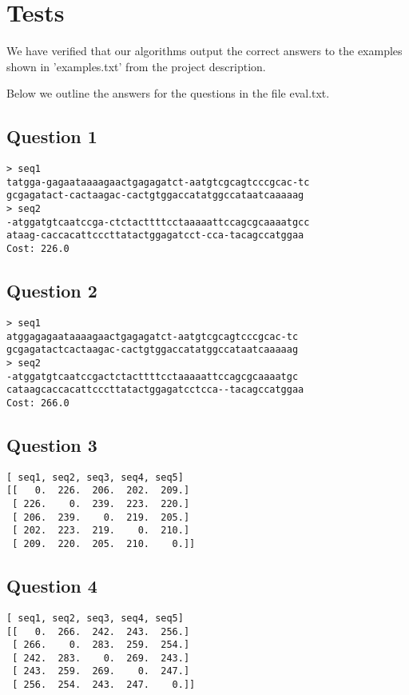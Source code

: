\section{Tests}
We have verified that our algorithms output the correct answers to the examples shown in 'examples.txt' from the project description. 

Below we outline the answers for the questions in the file eval.txt.

\subsection{Question 1}

\begin{verbatim}
> seq1
tatgga-gagaataaaagaactgagagatct-aatgtcgcagtcccgcac-tc
gcgagatact-cactaagac-cactgtggaccatatggccataatcaaaaag
> seq2
-atggatgtcaatccga-ctctacttttcctaaaaattccagcgcaaaatgcc
ataag-caccacattcccttatactggagatcct-cca-tacagccatggaa
Cost: 226.0
\end{verbatim}

\subsection{Question 2}

\begin{verbatim}
> seq1
atggagagaataaaagaactgagagatct-aatgtcgcagtcccgcac-tc
gcgagatactcactaagac-cactgtggaccatatggccataatcaaaaag
> seq2
-atggatgtcaatccgactctacttttcctaaaaattccagcgcaaaatgc
cataagcaccacattcccttatactggagatcctcca--tacagccatggaa
Cost: 266.0
\end{verbatim}

\subsection{Question 3}
\begin{verbatim}
[ seq1, seq2, seq3, seq4, seq5]
[[   0.  226.  206.  202.  209.]
 [ 226.    0.  239.  223.  220.]
 [ 206.  239.    0.  219.  205.]
 [ 202.  223.  219.    0.  210.]
 [ 209.  220.  205.  210.    0.]]
\end{verbatim}

\subsection{Question 4}
\begin{verbatim}
[ seq1, seq2, seq3, seq4, seq5]
[[   0.  266.  242.  243.  256.]
 [ 266.    0.  283.  259.  254.]
 [ 242.  283.    0.  269.  243.]
 [ 243.  259.  269.    0.  247.]
 [ 256.  254.  243.  247.    0.]]
\end{verbatim}